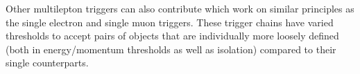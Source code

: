 Other multilepton triggers can also contribute which work on similar principles as the single electron and single muon triggers. These trigger chains have varied thresholds to accept pairs of objects that are individually more loosely defined (both in energy/momentum thresholds as well as isolation) compared to their single counterparts.~\cite{ATLASTDAQ}
